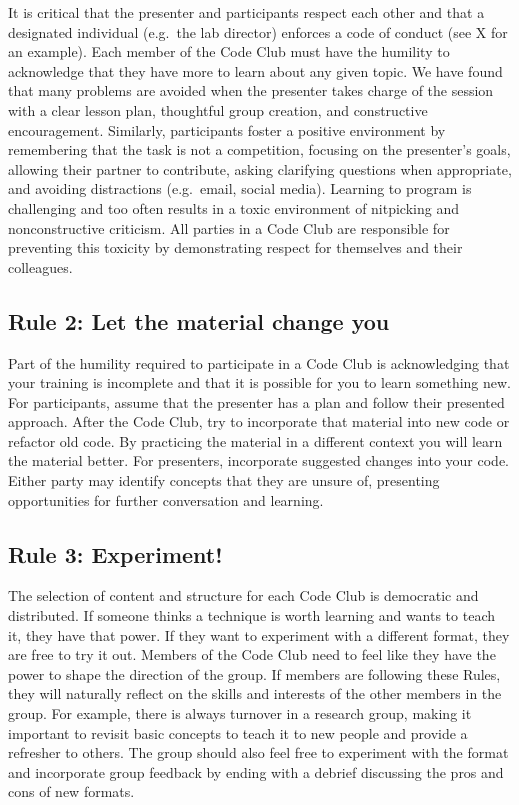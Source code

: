 \documentclass[11pt,]{article}
\begin{document}
It is critical that the presenter and participants respect each other
and that a designated individual (e.g.~the lab director) enforces a code
of conduct (see X for an example). Each member of the Code Club must
have the humility to acknowledge that they have more to learn about any
given topic. We have found that many problems are avoided when the
presenter takes charge of the session with a clear lesson plan,
thoughtful group creation, and constructive encouragement. Similarly,
participants foster a positive environment by remembering that the task
is not a competition, focusing on the presenter's goals, allowing their
partner to contribute, asking clarifying questions when appropriate, and
avoiding distractions (e.g.~email, social media). Learning to program is
challenging and too often results in a toxic environment of nitpicking
and nonconstructive criticism. All parties in a Code Club are
responsible for preventing this toxicity by demonstrating respect for
themselves and their colleagues.

\subsection{Rule 2: Let the material change
you}\label{rule-2-let-the-material-change-you}

Part of the humility required to participate in a Code Club is
acknowledging that your training is incomplete and that it is possible
for you to learn something new. For participants, assume that the
presenter has a plan and follow their presented approach. After the Code
Club, try to incorporate that material into new code or refactor old
code. By practicing the material in a different context you will learn
the material better. For presenters, incorporate suggested changes into
your code. Either party may identify concepts that they are unsure of,
presenting opportunities for further conversation and learning.

\subsection{Rule 3: Experiment!}\label{rule-3-experiment}

The selection of content and structure for each Code Club is democratic
and distributed. If someone thinks a technique is worth learning and
wants to teach it, they have that power. If they want to experiment with
a different format, they are free to try it out. Members of the Code
Club need to feel like they have the power to shape the direction of the
group. If members are following these Rules, they will naturally reflect
on the skills and interests of the other members in the group. For
example, there is always turnover in a research group, making it
important to revisit basic concepts to teach it to new people and
provide a refresher to others. The group should also feel free to
experiment with the format and incorporate group feedback by ending with
a debrief discussing the pros and cons of new formats.
\end{document}
